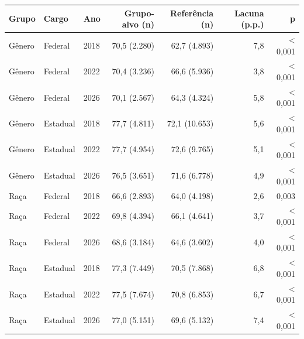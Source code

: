 \begin{tabular}{lllrrrr}
\toprule
Grupo & Cargo & Ano & Grupo-alvo (n) & Referência (n) & Lacuna (p.p.) & p \\
\midrule
Gênero & Federal & 2018 & 70,5 (2.280) & 62,7 (4.893) & 7,8 & < 0,001 \\
Gênero & Federal & 2022 & 70,4 (3.236) & 66,6 (5.936) & 3,8 & < 0,001 \\
Gênero & Federal & 2026 & 70,1 (2.567) & 64,3 (4.324) & 5,8 & < 0,001 \\
Gênero & Estadual & 2018 & 77,7 (4.811) & 72,1 (10.653) & 5,6 & < 0,001 \\
Gênero & Estadual & 2022 & 77,7 (4.954) & 72,6 (9.765) & 5,1 & < 0,001 \\
Gênero & Estadual & 2026 & 76,5 (3.651) & 71,6 (6.778) & 4,9 & < 0,001 \\
Raça & Federal & 2018 & 66,6 (2.893) & 64,0 (4.198) & 2,6 & 0,003 \\
Raça & Federal & 2022 & 69,8 (4.394) & 66,1 (4.641) & 3,7 & < 0,001 \\
Raça & Federal & 2026 & 68,6 (3.184) & 64,6 (3.602) & 4,0 & < 0,001 \\
Raça & Estadual & 2018 & 77,3 (7.449) & 70,5 (7.868) & 6,8 & < 0,001 \\
Raça & Estadual & 2022 & 77,5 (7.674) & 70,8 (6.853) & 6,7 & < 0,001 \\
Raça & Estadual & 2026 & 77,0 (5.151) & 69,6 (5.132) & 7,4 & < 0,001 \\
\bottomrule
\end{tabular}
